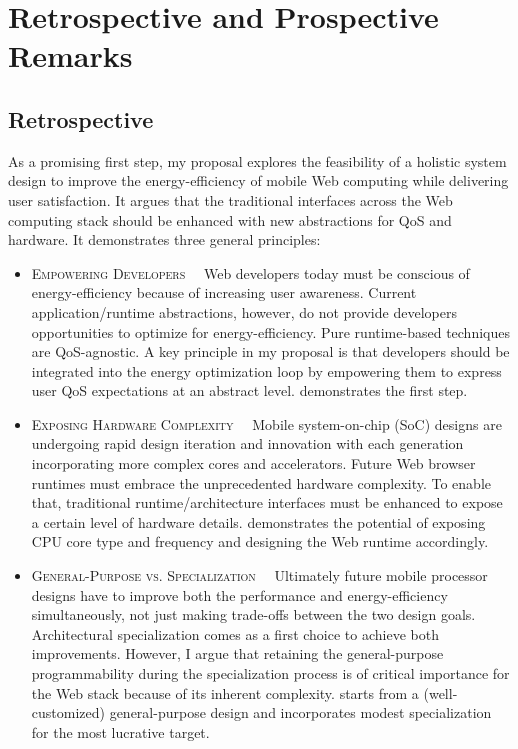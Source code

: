 
\chapter{Retrospective and Prospective Remarks}
\label{sec:conc}

\section{Retrospective}

As a promising first step, my proposal explores the feasibility of a holistic system design to improve the energy-efficiency of mobile Web computing while delivering user satisfaction. It argues that the traditional interfaces across the Web computing stack should be enhanced with new abstractions for QoS and hardware. It demonstrates three general principles:

\begin{itemize}
  \item \textsc{Empowering Developers~~} Web developers today must be conscious of energy-efficiency because of increasing user awareness. Current application/runtime abstractions, however, do not provide developers opportunities to optimize for energy-efficiency. Pure runtime-based techniques are QoS-agnostic. A key principle in my proposal is that developers should be integrated into the energy optimization loop by empowering them to express user QoS expectations at an abstract level. \greenweb demonstrates the first step.
  
  \item \textsc{Exposing Hardware Complexity~~} Mobile system-on-chip (SoC) designs are undergoing rapid design iteration and innovation with each generation incorporating more complex cores and accelerators. Future Web browser runtimes must embrace the unprecedented hardware complexity. To enable that, traditional runtime/architecture interfaces must be enhanced to expose a certain level of hardware details. \webrt demonstrates the potential of exposing CPU core type and frequency and designing the Web runtime accordingly.
  
  \item \textsc{General-Purpose vs. Specialization~~} Ultimately future mobile processor designs have to improve both the performance and energy-efficiency simultaneously, not just making trade-offs between the two design goals. Architectural specialization comes as a first choice to achieve both improvements. However, I argue that retaining the general-purpose programmability during the specialization process is of critical importance for the Web stack because of its inherent complexity. \webcore starts from a (well-customized) general-purpose design and incorporates modest specialization for the most lucrative target.
\end{itemize}

